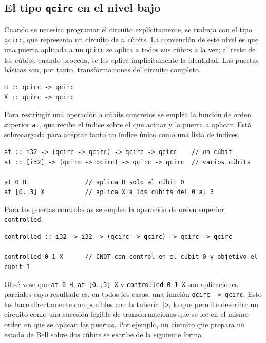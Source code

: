 \subsection{El tipo \texttt{qcirc} en el nivel bajo}
\label{subsec:qcirc-nivel-bajo}

Cuando se necesita programar el circuito explícitamente, se trabaja con el tipo \lstinline|qcirc|, que representa un circuito de $n$ cúbits. La convención de este nivel es que una puerta aplicada a un \lstinline|qcirc| se aplica a todos sus cúbits a la vez; al resto de los cúbits, cuando proceda, se les aplica implícitamente la identidad. Las puertas básicas son, por tanto, transformaciones del circuito completo.

\begin{lstlisting}[language={}, caption=Signaturas de las puertas básicas H y X sobre qcirc]
H :: qcirc -> qcirc
X :: qcirc -> qcirc
\end{lstlisting}

Para restringir una operación a cúbits concretos se emplea la función de orden superior \lstinline|at|, que recibe el índice sobre el que actuar y la puerta a aplicar. Está sobrecargada para aceptar tanto un índice único como una lista de índices.

\begin{lstlisting}[language={}, caption=Firma sobrecargada de at y ejemplos de aplicación parcial]
at :: i32 -> (qcirc -> qcirc) -> qcirc -> qcirc    // un cúbit
at :: [i32] -> (qcirc -> qcirc) -> qcirc -> qcirc  // varios cúbits

at 0 H                // aplica H solo al cúbit 0
at [0..3] X           // aplica X a los cúbits del 0 al 3
\end{lstlisting}

Para las puertas controladas se emplea la operación de orden superior \lstinline|controlled|.

\begin{lstlisting}[language={}, caption=Firma de controlled y ejemplo de puerta CNOT]
controlled :: i32 -> i32 -> (qcirc -> qcirc) -> qcirc -> qcirc

controlled 0 1 X      // CNOT con control en el cúbit 0 y objetivo el cúbit 1
\end{lstlisting}

Obsérvese que \lstinline|at 0 H|, \lstinline|at [0..3] X| y \lstinline|controlled 0 1 X| son aplicaciones parciales cuyo resultado es, en todos los casos, una función \lstinline|qcirc -> qcirc|. Esto las hace directamente componibles con la tubería \lstinline{|>}, lo que permite describir un circuito como una sucesión legible de transformaciones que se lee en el mismo orden en que se aplican las puertas. Por ejemplo, un circuito que prepara un estado de Bell sobre dos cúbits se escribe de la siguiente forma.


